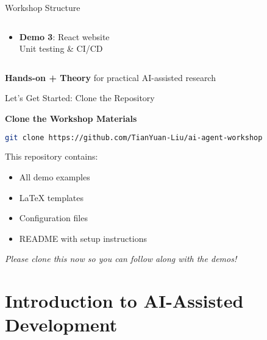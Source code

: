 \documentclass[aspectratio=169]{beamer}
\begin{document}
\begin{frame}{Workshop Structure}
\begin{columns}[T]
\begin{column}{0.48\textwidth}
\begin{itemize}
        \vspace{0.3cm}
        
        \item \textbf{Demo 3}: React website\\
        \small Unit testing \& CI/CD
      \end{itemize}
    \end{column}
  \end{columns}

  \vspace{0.5cm}
  \centering
  \normalsize
  \textbf{Hands-on + Theory} for practical AI-assisted research
\end{frame}

\begin{frame}[fragile]{Let's Get Started: Clone the Repository}
  \begin{center}
    \large\bfseries
    \textcolor{conesaTeal}{Clone the Workshop Materials}

    \vspace{0.8cm}

    \begin{lstlisting}[language=bash, basicstyle=\large\ttfamily]
git clone https://github.com/TianYuan-Liu/ai-agent-workshop
    \end{lstlisting}

    \vspace{0.8cm}

    \normalsize
    This repository contains:
    \begin{itemize}
      \item All demo examples
      \item LaTeX templates
      \item Configuration files
      \item README with setup instructions
    \end{itemize}

    \vspace{0.5cm}
    \textit{Please clone this now so you can follow along with the demos!}
  \end{center}
\end{frame}

\section{Introduction to AI-Assisted Development}
\end{document}
